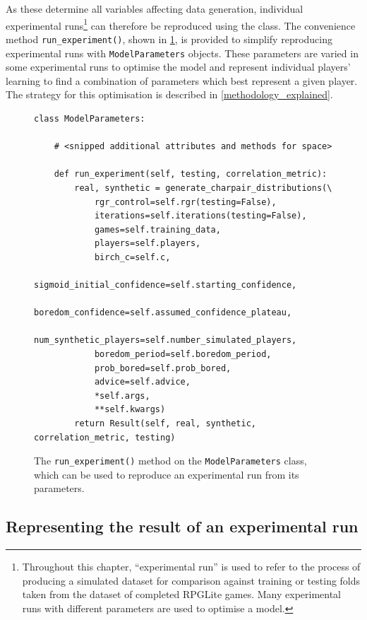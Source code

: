 As these determine all variables affecting data generation, individual
experimental runs\footnote{Throughout this chapter, ``experimental run'' is used
to refer to the process of producing a simulated dataset for comparison against
training or testing folds taken from the dataset of completed RPGLite games.
Many experimental runs with different parameters are used to optimise a model.}
can therefore be reproduced using the class. The convenience method
\lstinline{run_experiment()}, shown in
\cref{fig:ModelParameters_run_experiment_method}, is provided to simplify
reproducing experimental runs with \lstinline{ModelParameters} objects. These
parameters are varied in some experimental runs to optimise the model and
represent individual players' learning to find a combination of parameters which
best represent a given player. The strategy for this optimisation is described
in \cref{methodology_explained}.

\begin{figure}[bp]
  \begin{center}
    \begin{lstlisting}
class ModelParameters:

    # <snipped additional attributes and methods for space>

    def run_experiment(self, testing, correlation_metric):
        real, synthetic = generate_charpair_distributions(\
            rgr_control=self.rgr(testing=False),
            iterations=self.iterations(testing=False),
            games=self.training_data,
            players=self.players,
            birch_c=self.c,
            sigmoid_initial_confidence=self.starting_confidence,
            boredom_confidence=self.assumed_confidence_plateau,
            num_synthetic_players=self.number_simulated_players,
            boredom_period=self.boredom_period,
            prob_bored=self.prob_bored,
            advice=self.advice,
            *self.args,
            **self.kwargs)
        return Result(self, real, synthetic, correlation_metric, testing)
    \end{lstlisting}
  \end{center}
  \caption{The \lstinline{run_experiment()} method on the
  \lstinline{ModelParameters} class, which can be used to reproduce an
  experimental run from its parameters.}
  \label{fig:ModelParameters_run_experiment_method}
\end{figure}


\subsection{Representing the result of an experimental run}
\label{representing_results_of_an_experimental_run}

